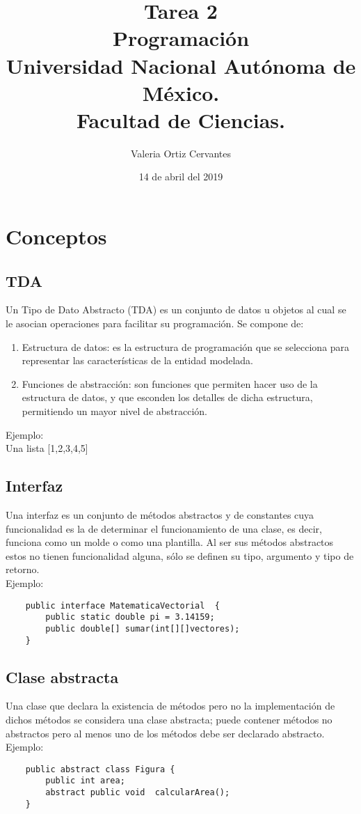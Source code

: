 \documentclass{book} %
\title{\Huge Tarea 2\\Programación\\Universidad Nacional Autónoma de México.\\Facultad de Ciencias.\\}
\author{\huge Valeria Ortiz Cervantes}
\date{\LARGE 14 de abril del 2019}
\begin{document}
\maketitle
\newpage
\tableofcontents

\chapter{\large Conceptos}
\section{TDA}
Un Tipo de Dato Abstracto (TDA) es un conjunto de datos u objetos al cual se le asocian operaciones para facilitar su programación. Se compone de:
\begin{enumerate}
	\item Estructura de datos: es la estructura de programación que se selecciona para representar las características de la entidad modelada.
	\item Funciones de abstracción: son funciones que permiten hacer uso de la estructura de datos, y que esconden los detalles de dicha estructura, permitiendo un mayor nivel de abstracción.
\end{enumerate}
Ejemplo: \\Una lista [1,2,3,4,5]
\section{Interfaz}
Una interfaz es un conjunto de métodos abstractos y de constantes cuya funcionalidad es la de determinar el funcionamiento de una clase, es decir, funciona como un molde o como una plantilla. Al ser sus métodos abstractos estos no tienen funcionalidad alguna, sólo se definen su tipo, argumento y tipo de retorno. \\Ejemplo: 
\begin{verbatim}
	public interface MatematicaVectorial  {
		public static double pi = 3.14159;
		public double[] sumar(int[][]vectores);
	}
\end{verbatim}
\section{Clase abstracta}
Una clase que declara la existencia de métodos pero no la implementación de dichos métodos se considera una clase abstracta; puede contener métodos no abstractos pero al menos uno de los métodos debe ser declarado abstracto.\\Ejemplo:
\begin{verbatim}
	public abstract class Figura {
		public int area;
		abstract public void  calcularArea();	
	}
\end{verbatim}
\end{document}
